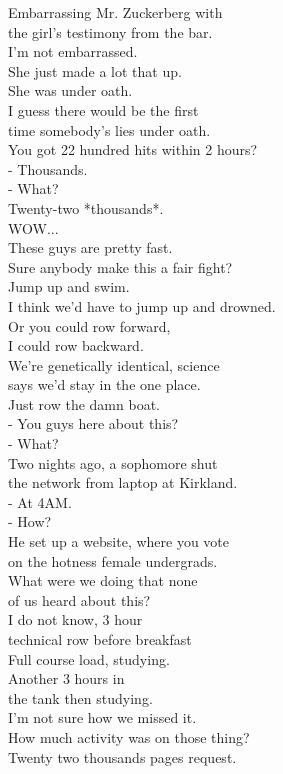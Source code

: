 \documentclass{article}
\begin{document}
\begin{multicols}{3}
Embarrassing Mr. Zuckerberg with\\
the girl's testimony from the bar.\\
I'm not embarrassed.\\
She just made a lot that up.\\
She was under oath.\\
I guess there would be the first\\
time somebody's lies under oath.\\
You got 22 hundred hits within 2 hours?\\
- Thousands.\\
- What?\\
Twenty-two *thousands*.\\
WOW...\\
These guys are pretty fast.\\
Sure anybody make this a fair fight?\\
Jump up and swim.\\
I think we'd have to jump up and drowned.\\
Or you could row forward,\\
I could row backward.\\
We're genetically identical, science\\
says we'd stay in the one place.\\
Just row the damn boat.\\
- You guys here about this?\\
- What?\\
Two nights ago, a sophomore shut\\
the network from laptop at Kirkland.\\
- At 4AM.\\
- How?\\
He set up a website, where you vote\\
on the hotness female undergrads.\\
What were we doing that none\\
of us heard about this?\\
I do not know, 3 hour\\
technical row before breakfast\\
Full course load, studying.\\
Another 3 hours in\\
the tank then studying.\\
I'm not sure how we missed it.\\
How much activity was on those thing?\\
Twenty two thousands pages request.\\

\end{multicols}
\end{document}
